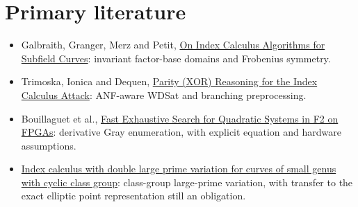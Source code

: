\documentclass[11pt]{article}
\begin{document}
\section*{Primary literature}
\begin{itemize}
\item Galbraith, Granger, Merz and Petit, \href{https://sacworkshop.org/SAC20/files/preproceedings/18-IndexCalculus.pdf}{On Index Calculus Algorithms for Subfield Curves}: invariant factor-base domains and Frobenius symmetry.
\item Trimoska, Ionica and Dequen, \href{https://arxiv.org/abs/2001.11229}{Parity (XOR) Reasoning for the Index Calculus Attack}: ANF-aware WDSat and branching preprocessing.
\item Bouillaguet et al., \href{https://perso.lip6.fr/Charles.Bouillaguet/static/publis/SAC13b.pdf}{Fast Exhaustive Search for Quadratic Systems in F2 on FPGAs}: derivative Gray enumeration, with explicit equation and hardware assumptions.
\item \href{https://arxiv.org/abs/math/0606607}{Index calculus with double large prime variation for curves of small genus with cyclic class group}: class-group large-prime variation, with transfer to the exact elliptic point representation still an obligation.
\end{itemize}
\end{document}
